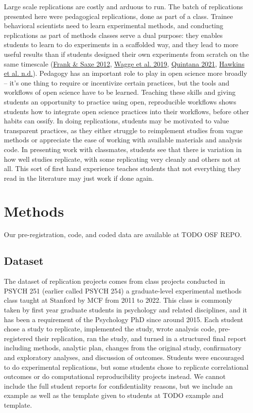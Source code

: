 \documentclass[
  english,
  a4paper,
]{article}
\begin{document}
Large scale replications are costly and arduous to run. The batch of replications presented here were pedagogical replications, done as part of a class. Trainee behavioral scientists need to learn experimental methods, and conducting replications as part of methods classes serve a dual purpose: they enables students to learn to do experiments in a scaffolded way, and they lead to more useful results than if students designed their own experiments from scratch on the same timescale (\protect\hyperlink{ref-frank2012}{Frank \& Saxe 2012}, \protect\hyperlink{ref-wagge2019}{Wagge et al. 2019}, \protect\hyperlink{ref-quintana2021}{Quintana 2021}, \protect\hyperlink{ref-hawkins}{Hawkins et al. n.d.}). Pedagogy has an important role to play in open science more broadly -- it's one thing to require or incentivize certain practices, but the tools and workflows of open science have to be learned. Teaching these skills and giving students an opportunity to practice using open, reproducible workflows shows students how to integrate open science practices into their workflows, before other habits can ossify. In doing replications, students may be motivated to value transparent practices, as they either struggle to reimplement studies from vague methods or appreciate the ease of working with available materials and analysis code. In presenting work with classmates, students see that there is variation in how well studies replicate, with some replicating very cleanly and others not at all. This sort of first hand experience teaches students that not everything they read in the literature may just work if done again.

\hypertarget{methods}{%
\section{Methods}\label{methods}}

Our pre-registration, code, and coded data are available at TODO OSF REPO.

\hypertarget{dataset}{%
\subsection{Dataset}\label{dataset}}

The dataset of replication projects comes from class projects conducted in PSYCH 251 (earlier called PSYCH 254) a graduate-level experimental methods class taught at Stanford by MCF from 2011 to 2022. This class is commonly taken by first year graduate students in psychology and related disciplines, and it has been a requirement of the Psychology PhD since around 2015. Each student chose a study to replicate, implemented the study, wrote analysis code, pre-registered their replication, ran the study, and turned in a structured final report including methods, analytic plan, changes from the original study, confirmatory and exploratory analyses, and discussion of outcomes. Students were encouraged to do experimental replications, but some students chose to replicate correlational outcomes or do computational reproducibility projects instead. We cannot include the full student reports for confidentiality reasons, but we include an example as well as the template given to students at TODO example and template.
\end{document}
